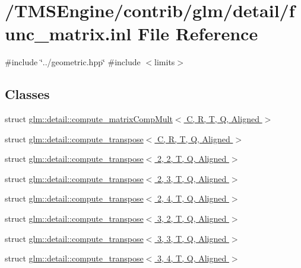 \hypertarget{func__matrix_8inl}{}\section{/\+T\+M\+S\+Engine/contrib/glm/detail/func\+\_\+matrix.inl File Reference}
\label{func__matrix_8inl}
{\ttfamily \#include \char`\"{}../geometric.\+hpp\char`\"{}}\newline
{\ttfamily \#include $<$limits$>$}\newline
\subsection*{Classes}
\begin{DoxyCompactItemize}
\item 
struct \hyperlink{structglm_1_1detail_1_1compute__matrix_comp_mult}{glm\+::detail\+::compute\+\_\+matrix\+Comp\+Mult$<$ C, R, T, Q, Aligned $>$}
\item 
struct \hyperlink{structglm_1_1detail_1_1compute__transpose}{glm\+::detail\+::compute\+\_\+transpose$<$ C, R, T, Q, Aligned $>$}
\item 
struct \hyperlink{structglm_1_1detail_1_1compute__transpose_3_012_00_012_00_01_t_00_01_q_00_01_aligned_01_4}{glm\+::detail\+::compute\+\_\+transpose$<$ 2, 2, T, Q, Aligned $>$}
\item 
struct \hyperlink{structglm_1_1detail_1_1compute__transpose_3_012_00_013_00_01_t_00_01_q_00_01_aligned_01_4}{glm\+::detail\+::compute\+\_\+transpose$<$ 2, 3, T, Q, Aligned $>$}
\item 
struct \hyperlink{structglm_1_1detail_1_1compute__transpose_3_012_00_014_00_01_t_00_01_q_00_01_aligned_01_4}{glm\+::detail\+::compute\+\_\+transpose$<$ 2, 4, T, Q, Aligned $>$}
\item 
struct \hyperlink{structglm_1_1detail_1_1compute__transpose_3_013_00_012_00_01_t_00_01_q_00_01_aligned_01_4}{glm\+::detail\+::compute\+\_\+transpose$<$ 3, 2, T, Q, Aligned $>$}
\item 
struct \hyperlink{structglm_1_1detail_1_1compute__transpose_3_013_00_013_00_01_t_00_01_q_00_01_aligned_01_4}{glm\+::detail\+::compute\+\_\+transpose$<$ 3, 3, T, Q, Aligned $>$}
\item 
struct \hyperlink{structglm_1_1detail_1_1compute__transpose_3_013_00_014_00_01_t_00_01_q_00_01_aligned_01_4}{glm\+::detail\+::compute\+\_\+transpose$<$ 3, 4, T, Q, Aligned $>$}
\item 

\end{DoxyCompactItemize}
